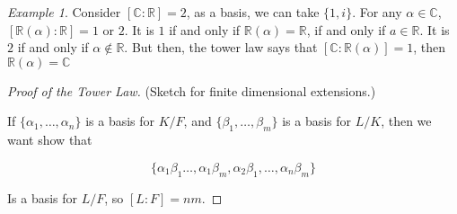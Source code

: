 \documentclass[12pt]{article}
\def\R{{\mathbb R}}
\def\C{{\mathbb C}}
\theoremstyle{remark}
\theoremstyle{remark}
\theoremstyle{remark}
\newtheorem{example}{Example}
\theoremstyle{remark}
\theoremstyle{remark}
\begin{document}
\begin{example}
  Consider $[\C : \R] = 2$, as a basis, we can take $\{1, i\}$. For any $\alpha
  \in \C$, $[\R(\alpha) : \R] = 1$ or $2$. It is $1$ if and only if $\R(\alpha)
  = \R$, if and only if $a \in \R$. It is $2$ if and only if $\alpha \not\in
  \R$. But then, the tower law says that $[\C : \R(\alpha)] = 1$, then
  $\R(\alpha) = \C$
\end{example}

\begin{proof}[Proof of the Tower Law]
  (Sketch for finite dimensional extensions.)

  If $\{ \alpha_1, \dots, \alpha_n \}$ is a basis for $K / F$, and $\{\beta_1,
  \dots, \beta_m\}$ is a basis for $L / K$, then we want show that 

  \[
    \{\alpha_1 \beta_1 \dots, \alpha_1 \beta_m, \alpha_2 \beta_1, \dots, \alpha_n \beta_m \}
  \]

  Is a basis for $L / F$, so $[L : F] = nm$.
\end{proof}
\end{document}
